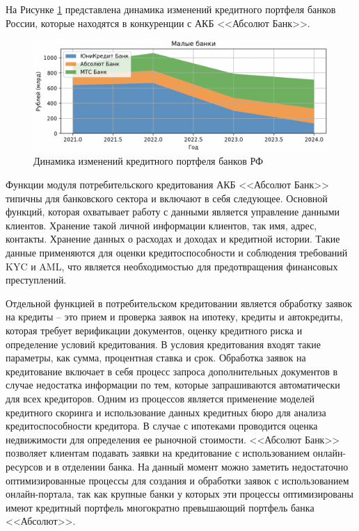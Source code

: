 \documentclass[14pt, a4paper]{extarticle}
\begin{document}
На Рисунке \ref{fig:кредитный_портфель_банков_малые} представлена динамика
изменений кредитного портфеля банков России, которые находятся в конкуренции с
АКБ <<Абсолют Банк>>.

\begin{figure}[H]
	\centering
	\includegraphics[width=\textwidth]{кредитный_портфель_банков_малые}
	\caption{Динамика изменений кредитного портфеля банков РФ}
	\label{fig:кредитный_портфель_банков_малые}
\end{figure}

Функции модуля потребительского кредитования АКБ <<Абсолют Банк>> типичны для
банковского сектора и включают в себя следующее. Основной функций, которая
охватывает работу с данными является управление данными клиентов. Хранение
такой личной информации клиентов, так имя, адрес, контакты. Хранение данных о
расходах и доходах и кредитной истории. Такие данные применяются для оценки
кредитоспособности и соблюдения требований KYC и AML, что является
необходимостью для предотвращения финансовых преступлений.

Отдельной функцией в потребительском кредитовании является обработку заявок на
кредиты -- это прием и проверка заявок на ипотеку, кредиты и автокредиты,
которая требует верификации документов, оценку кредитного риска и определение
условий кредитования. В условия кредитования входят такие параметры, как сумма,
процентная ставка и срок. Обработка заявок на кредитование включает в себя
процесс запроса дополнительных документов в случае недостатка информации по
тем, которые запрашиваются автоматически для всех кредиторов. Одним из
процессов является применение моделей кредитного скоринга и использование
данных кредитных бюро для анализа кредитоспособности кредитора. В случае с
ипотеками проводится оценка недвижимости для определения ее рыночной стоимости.
<<Абсолют Банк>> позволяет клиентам подавать заявки на кредитование с
использованием онлайн-ресурсов и в отделении банка. На данный момент можно
заметить недостаточно оптимизированные процессы для создания и обработки заявок
с использованием онлайн-портала, так как крупные банки у которых эти процессы
оптимизированы имеют кредитный портфель многократно превышающий портфель банка
<<Абсолют>>.
\end{document}
